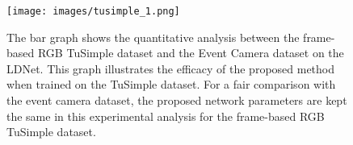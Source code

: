 \documentclass[journal]{IEEEtran}
\begin{document}
\begin{figure}[t]
\centering
\texttt{[image: images/tusimple\_1.png]}
\caption{ The bar graph shows the quantitative analysis between the frame-based RGB TuSimple dataset and the Event Camera dataset on the LDNet. This graph illustrates the efficacy of the proposed method when trained on the TuSimple dataset. For a fair comparison with the event camera dataset, the proposed network parameters are kept the same in this experimental analysis for the frame-based RGB TuSimple dataset. }
\label{tusimple-r3}
\end{figure}


\begin{table}[t]
\centering
\caption{Comparison of the evaluation results of LDNet with other state-of-the-art methods on the Event Segmentation dataset. The mean F1 scores (\%), mean IoUs (\%) and accuracy are used as evaluation metrics for the semantic labels. ``-`` indicates the metric is not included in the evaluation. The values in bold are the best scores.}
\label{EV}
\end{table}
\end{document}
